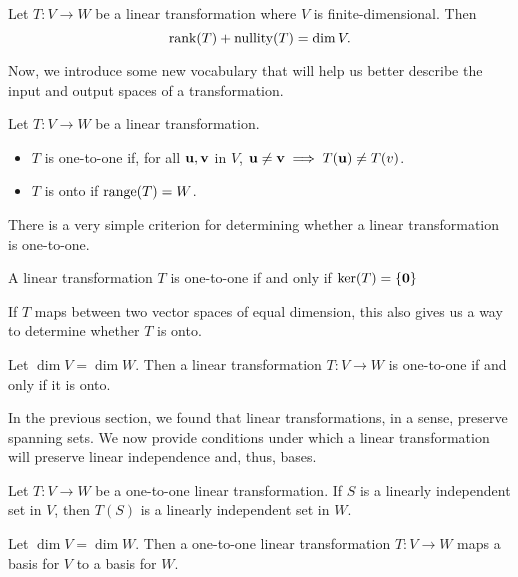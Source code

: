\documentclass[../m73main.tex]{subfiles}
\begin{document}
\begin{theorem}
	Let $T : V \to W$ be a linear transformation where $V$ is finite-dimensional.
	Then
	\[ \textrm{rank}(T) + \textrm{nullity}(T) = \dim V. \]
\end{theorem}

Now, we introduce some new vocabulary that will help us better describe the input and output spaces of a transformation.

\begin{definition}
	Let $T : V \to W$ be a linear transformation.
	\begin{itemize}
		\item $T$ is one-to-one if, for all $\mathbf{u}, \mathbf{v}$ in $V$, $\mathbf{u} \neq \mathbf{v} \implies T(\mathbf{u}) \neq T(v)$.
		\item $T$ is onto if $\textrm{range}(T) = W$.
	\end{itemize}
\end{definition}

There is a very simple criterion for determining whether a linear transformation is one-to-one.

\begin{theorem}
	A linear transformation $T$ is one-to-one if and only if $\textrm{ker}(T) = \{\mathbf{0}\}$
\end{theorem}

If $T$ maps between two vector spaces of equal dimension, this also gives us a way to determine whether $T$ is onto.

\begin{theorem}
	Let $\dim V = \dim W$.
	Then a linear transformation $T : V \to W$ is one-to-one if and only if it is onto.
\end{theorem}

In the previous section, we found that linear transformations, in a sense, preserve spanning sets.
We now provide conditions under which a linear transformation will preserve linear independence and, thus, bases.

\begin{theorem}
	Let $T : V \to W$ be a one-to-one linear transformation.
	If $S$ is a linearly independent set in $V$, then $T(S)$ is a linearly independent set in $W$.
\end{theorem}

\begin{corollary}
	Let $\dim V = \dim W$.
	Then a one-to-one linear transformation $T : V \to W$ maps a basis for $V$ to a basis for $W$.
\end{corollary}
\end{document}
